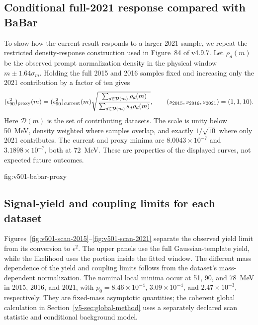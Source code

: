 

\subsection{Conditional full-2021 response compared with BaBar}
\label{sec:v501-babar-proxy}
To show how the current result responds to a larger 2021 sample, we repeat
the restricted density-response construction used in Figure~84 of v4.9.7.
Let $\rho_d(m)$ be the observed prompt normalization density in the physical
window $m\pm1.64\sigma_m$. Holding the full 2015 and 2016 samples fixed and
increasing only the 2021 contribution by a factor of ten gives
\begin{equation}
 (\epsilon^2_{90})_{\rm proxy}(m)
 = (\epsilon^2_{90})_{\rm current}(m)
 \sqrt{\frac{\sum_{d\in\mathcal D(m)}\rho_d(m)}
 {\sum_{d\in\mathcal D(m)}s_d\rho_d(m)}} ,
 \qquad (s_{2015},s_{2016},s_{2021})=(1,1,10).
 \label{eq:v501-density-proxy}
\end{equation}
Here $\mathcal D(m)$ is the set of contributing datasets. The scale is unity below
50~MeV, density weighted where samples overlap, and exactly $1/\sqrt{10}$
where only 2021 contributes. The current and proxy minima are
$8.0043\times10^{-7}$ and $3.1898\times10^{-7}$, both at 72~MeV.
These are properties of the displayed curves, not expected future outcomes.

{fig:v501-babar-proxy}
\FloatBarrier

\subsection{Signal-yield and coupling limits for each dataset}
\label{sec:v501-individual-scans}\label{sec:selected-individual-results}
Figures~\ref{fig:v501-scan-2015}--\ref{fig:v501-scan-2021} separate the
observed yield limit from its conversion to $\epsilon^2$. The upper panels
use the full Gaussian-template yield, while the likelihood uses the portion
inside the fitted window. The different mass dependence of the yield and
coupling limits follows from the dataset's mass-dependent normalization.
The nominal local minima occur at 51, 90, and 78~MeV in 2015, 2016, and
2021, with $p_0=8.46\times10^{-4}$, $3.09\times10^{-4}$, and
$2.47\times10^{-3}$, respectively. They are fixed-mass asymptotic quantities;
the coherent global calculation in Section~\ref{v5-sec:global-method} uses
a separately declared scan statistic and conditional background model.

